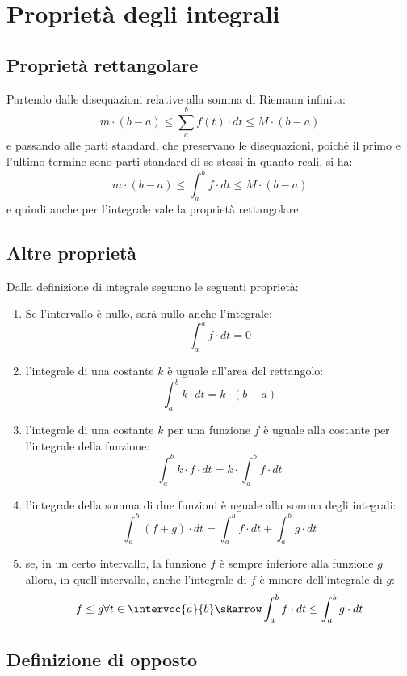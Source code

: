 \section{Proprietà degli integrali}
\label{sec:integrali_proprieta}

\subsection{Proprietà rettangolare}
\label{subsec:integrali_proprieta_rettangolare}

Partendo dalle disequazioni relative alla somma di Riemann infinita:
\[m \cdot (b - a) \le  \sum_a^b f(t) \cdot dt  \le M\cdot(b - a)\]
e passando alle parti standard, che 
preservano le disequazioni, poiché il primo e l'ultimo termine sono parti 
standard di se stessi in quanto reali, si ha: 
\[m \cdot(b - a) \le  \int_a^b f \cdot dt  \le M\cdot(b - a)\] 
e quindi anche per l'integrale vale la proprietà rettangolare.

\subsection{Altre proprietà }
\label{subsec:integrali_altre_proprieta}

Dalla definizione di integrale seguono le seguenti proprietà:
\begin{enumerate}
 \item Se l'intervallo è nullo, sarà nullo anche l'integrale:
\[\int_a^a f \cdot dt=0\] 
 \item l'integrale di una costante \(k\) è uguale all'area del rettangolo:
\[\int_a^b k \cdot dt = k \cdot (b-a)\]
 \item l'integrale di una costante \(k\) per una funzione \(f\) è uguale alla 
costante per l'integrale della funzione:
\[\int_a^b k \cdot f \cdot dt = k\cdot\int_a^b f \cdot dt\]
 \item l'integrale della somma di due funzioni è uguale alla somma degli 
integrali:
\[\int_a^b (f+g)\cdot dt = \int_a^b f \cdot dt + \int_a^b g\cdot dt\]
 \item se, in un certo intervallo, la funzione \(f\) è sempre inferiore alla 
funzione \(g\) allora, in quell'intervallo, anche l'integrale di \(f\) è 
minore dell'integrale di \(g\):
\[f \le g \forall t \in \intervcc{a}{b} \sRarrow 
\int_a^b f \cdot dt \le \int_a^b g\cdot dt\]
\end{enumerate}

\subsection{Definizione di opposto}
\label{subsec:integrali_opposto}

